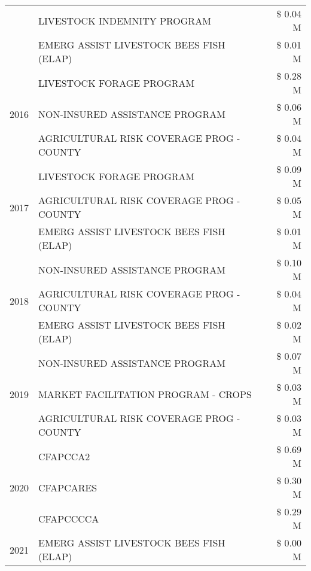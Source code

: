 \begin{tabular}{llr}
 & LIVESTOCK INDEMNITY PROGRAM & \$ 0.04 M \\
 & EMERG ASSIST LIVESTOCK BEES FISH (ELAP) & \$ 0.01 M \\
\cline{1-3}
\multirow[t]{3}{*}{2016} & LIVESTOCK FORAGE PROGRAM & \$ 0.28 M \\
 & NON-INSURED ASSISTANCE PROGRAM & \$ 0.06 M \\
 & AGRICULTURAL RISK COVERAGE PROG - COUNTY & \$ 0.04 M \\
\cline{1-3}
\multirow[t]{3}{*}{2017} & LIVESTOCK FORAGE PROGRAM & \$ 0.09 M \\
 & AGRICULTURAL RISK COVERAGE PROG - COUNTY & \$ 0.05 M \\
 & EMERG ASSIST LIVESTOCK BEES FISH (ELAP) & \$ 0.01 M \\
\cline{1-3}
\multirow[t]{3}{*}{2018} & NON-INSURED ASSISTANCE PROGRAM & \$ 0.10 M \\
 & AGRICULTURAL RISK COVERAGE PROG - COUNTY & \$ 0.04 M \\
 & EMERG ASSIST LIVESTOCK BEES FISH (ELAP) & \$ 0.02 M \\
\cline{1-3}
\multirow[t]{3}{*}{2019} & NON-INSURED ASSISTANCE PROGRAM & \$ 0.07 M \\
 & MARKET FACILITATION PROGRAM - CROPS & \$ 0.03 M \\
 & AGRICULTURAL RISK COVERAGE PROG - COUNTY & \$ 0.03 M \\
\cline{1-3}
\multirow[t]{3}{*}{2020} & CFAPCCA2 & \$ 0.69 M \\
 & CFAPCARES & \$ 0.30 M \\
 & CFAPCCCCA & \$ 0.29 M \\
\cline{1-3}
2021 & EMERG ASSIST LIVESTOCK BEES FISH (ELAP) & \$ 0.00 M \\
\cline{1-3}
\bottomrule
\end{tabular}
